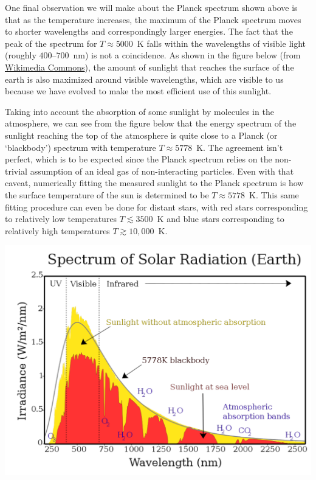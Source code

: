 One final observation we will make about the Planck spectrum shown above is that as the temperature increases, the maximum of the Planck spectrum moves to shorter wavelengths and correspondingly larger energies.
The fact that the peak of the spectrum for $T \approx 5000$~K falls within the wavelengths of visible light (roughly $400$--$700$~nm) is not a coincidence.
As shown in the figure below (from \href{https://commons.wikimedia.org/wiki/File:Solar_Spectrum.png}{Wikimedia Commons}), the amount of sunlight that reaches the surface of the earth is also maximized around visible wavelengths, which are visible to us because we have evolved to make the most efficient use of this sunlight.

Taking into account the absorption of some sunlight by molecules in the atmosphere, we can see from the figure below that the energy spectrum of the sunlight reaching the top of the atmosphere is quite close to a Planck (or `blackbody') spectrum with temperature $T \approx 5778$~K.
The agreement isn't perfect, which is to be expected since the Planck spectrum relies on the non-trivial assumption of an ideal gas of non-interacting particles.
Even with that caveat, numerically fitting the measured sunlight to the Planck spectrum is how the surface temperature of the sun is determined to be $T \approx 5778$~K.
This same fitting procedure can even be done for distant stars, with red stars corresponding to relatively low temperatures $T \lesssim 3500$~K and blue stars corresponding to relatively high temperatures $T \gtrsim 10{,}000$~K.

\begin{center}\includegraphics[width=\textwidth]{figs/unit08_sun.pdf}\end{center}

